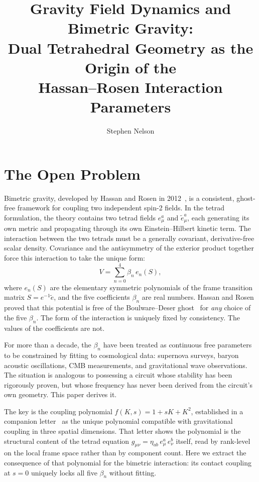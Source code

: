 \documentclass[a4paper,11pt]{article}
\title{\boldmath Gravity Field Dynamics and Bimetric Gravity:\\
Dual Tetrahedral Geometry as the Origin of the\\
Hassan--Rosen Interaction Parameters}
\author{Stephen Nelson}
\affiliation{Field Dynamics Research\\
\href{mailto:contact@fielddynamics.org}{contact@fielddynamics.org}}
\begin{document}
\maketitle

\section{The Open Problem}

Bimetric gravity, developed by Hassan and Rosen in
2012~\cite{HR2012a,HR2012b}, is a consistent, ghost-free
framework for coupling two independent spin-2 fields. In
the tetrad formulation, the theory contains two tetrad
fields $e^a_\mu$ and $\tilde{e}^a_\mu$, each generating its
own metric and propagating through its own Einstein--Hilbert
kinetic term. The interaction between the two tetrads must
be a generally covariant, derivative-free scalar density.
Covariance and the antisymmetry of the exterior product
together force this interaction to take the unique form:
\begin{equation}
  V = \sum_{n=0}^{4} \beta_n\, e_n(S),
  \label{eq:potential}
\end{equation}
where $e_n(S)$ are the elementary symmetric polynomials
of the frame transition matrix $S = e^{-1}\tilde{e}$, and
the five coefficients $\beta_n$ are real numbers. Hassan
and Rosen proved that this potential is free of the
Boulware--Deser ghost~\cite{BD1972} for \emph{any} choice
of the five $\beta_n$. The form of the interaction is
uniquely fixed by consistency. The values of the
coefficients are not.

For more than a decade, the $\beta_n$ have been treated
as continuous free parameters to be constrained by fitting
to cosmological data: supernova surveys, baryon acoustic
oscillations, CMB measurements, and gravitational wave
observations. The situation is analogous to possessing a
circuit whose stability has been rigorously proven, but
whose frequency has never been derived from the circuit's
own geometry. This paper derives it.

The key is the coupling polynomial $f(K,s) = 1 + sK + K^2$,
established in a companion letter~\cite{Nelson2026a} as
the unique polynomial compatible with gravitational coupling
in three spatial dimensions. That letter shows the
polynomial is the structural content of the tetrad equation
$g_{\mu\nu} = \eta_{ab}\,e^a_\mu\,e^b_\nu$ itself, read
by rank-level on the local frame space rather than by
component count. Here we
extract the consequence of that polynomial for the
bimetric interaction: its contact coupling at $s = 0$
uniquely locks all five $\beta_n$ without fitting.
\end{document}
